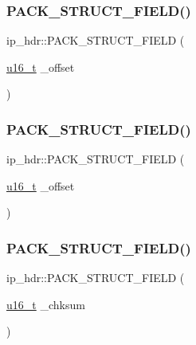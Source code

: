 \subsubsection{\texorpdfstring{P\+A\+C\+K\+\_\+\+S\+T\+R\+U\+C\+T\+\_\+\+F\+I\+E\+L\+D()}{PACK\_STRUCT\_FIELD()}\hspace{0.1cm}{\footnotesize\ttfamily [5/8]}}
{\footnotesize\ttfamily ip\+\_\+hdr\+::\+P\+A\+C\+K\+\_\+\+S\+T\+R\+U\+C\+T\+\_\+\+F\+I\+E\+LD (\begin{DoxyParamCaption}\item[{\hyperlink{group__compiler__abstraction_ga77570ac4fcab86864fa1916e55676da2}{u16\+\_\+t}}]{\+\_\+offset }\end{DoxyParamCaption})}

\mbox{\label{structip__hdr_a2c93d9f414cb5e3bd727799393b3688a}} 
\subsubsection{\texorpdfstring{P\+A\+C\+K\+\_\+\+S\+T\+R\+U\+C\+T\+\_\+\+F\+I\+E\+L\+D()}{PACK\_STRUCT\_FIELD()}\hspace{0.1cm}{\footnotesize\ttfamily [6/8]}}
{\footnotesize\ttfamily ip\+\_\+hdr\+::\+P\+A\+C\+K\+\_\+\+S\+T\+R\+U\+C\+T\+\_\+\+F\+I\+E\+LD (\begin{DoxyParamCaption}\item[{\hyperlink{group__compiler__abstraction_ga77570ac4fcab86864fa1916e55676da2}{u16\+\_\+t}}]{\+\_\+offset }\end{DoxyParamCaption})}

\mbox{\label{structip__hdr_a620275dbd7f7b8f02cf3f90fa035eb62}} 
\subsubsection{\texorpdfstring{P\+A\+C\+K\+\_\+\+S\+T\+R\+U\+C\+T\+\_\+\+F\+I\+E\+L\+D()}{PACK\_STRUCT\_FIELD()}\hspace{0.1cm}{\footnotesize\ttfamily [7/8]}}
{\footnotesize\ttfamily ip\+\_\+hdr\+::\+P\+A\+C\+K\+\_\+\+S\+T\+R\+U\+C\+T\+\_\+\+F\+I\+E\+LD (\begin{DoxyParamCaption}\item[{\hyperlink{group__compiler__abstraction_ga77570ac4fcab86864fa1916e55676da2}{u16\+\_\+t}}]{\+\_\+chksum }\end{DoxyParamCaption})}


